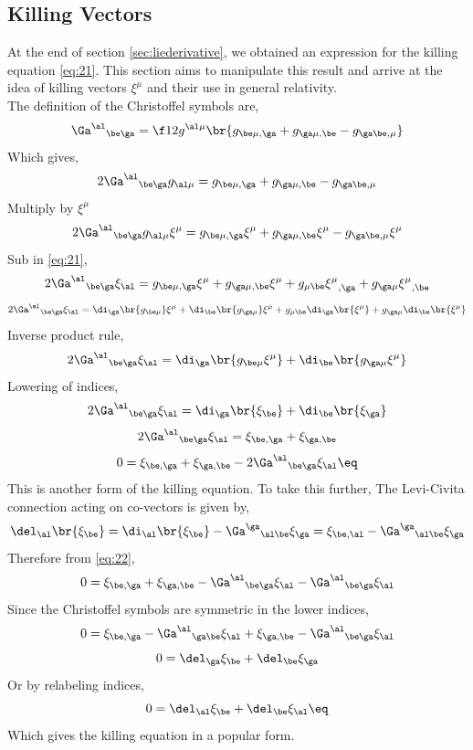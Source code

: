 \documentclass{article}
\begin{document}
\subsection{Killing Vectors}
\label{sec:killing}
At the end of section \ref{sec:liederivative}, we obtained an expression for the killing equation \eqref{eq:21}. This section aims to manipulate this result and arrive at the idea of killing vectors $\xi^\mu$ and their use in general relativity.\\

The definition of the Christoffel symbols are,
\[ {\Ga^\al}_{\be\ga} = \f12 g^{\al\mu}\br{g_{\be\mu,\ga} + g_{\ga\mu,\be} - g_{\ga\be,\mu}}  \]
Which gives,
\[ 2{\Ga^\al}_{\be\ga}g_{\al\mu} = g_{\be\mu,\ga} + g_{\ga\mu,\be} - g_{\ga\be,\mu}  \]
Multiply by $\xi^\mu$
\[ 2{\Ga^\al}_{\be\ga}g_{\al\mu}\xi^\mu = g_{\be\mu,\ga}\xi^\mu + g_{\ga\mu,\be}\xi^\mu - g_{\ga\be,\mu} \xi^\mu \]
Sub in \eqref{eq:21},
\[ 2{\Ga^\al}_{\be\ga}\xi_\al = g_{\be\mu,\ga}\xi^\mu + g_{\ga\mu,\be}\xi^\mu +g_{\mu\be} {\xi^\mu}_{,\ga} + g_{\ga\mu} {\xi^\mu}_{,\be}  \]
\[ 2{\Ga^\al}_{\be\ga}\xi_\al = \di_\ga\br{g_{\be\mu}}\xi^\mu + \di_\be\br{g_{\ga\mu}}\xi^\mu +g_{\mu\be} \di_\ga\br{\xi^\mu} + g_{\ga\mu} \di_\be\br{\xi^\mu}  \]
Inverse product rule,
\[ 2{\Ga^\al}_{\be\ga}\xi_\al = \di_\ga\br{g_{\be\mu}\xi^\mu} + \di_\be\br{g_{\ga\mu}\xi^\mu} \]
Lowering of indices,
\[ 2{\Ga^\al}_{\be\ga}\xi_\al = \di_\ga\br{\xi_\be} + \di_\be\br{\xi_\ga} \]
\[ 2{\Ga^\al}_{\be\ga}\xi_\al = \xi_{\be,\ga} + \xi_{\ga,\be} \]
\[ 0 = \xi_{\be,\ga} + \xi_{\ga,\be} - 2{\Ga^\al}_{\be\ga}\xi_\al \eq \label{eq:22}\]
This is another form of the killing equation. To take this further,
The Levi-Civita connection acting on co-vectors is given by,
\[ \del_\al \br{\xi_\be} = \di_\al\br{\xi_\be} - {\Ga^\ga}_{\al\be} \xi_\ga = \xi_{\be,\al} - {\Ga^\ga}_{\al\be} \xi_\ga \]
Therefore from \eqref{eq:22},
\[ 0 = \xi_{\be,\ga} + \xi_{\ga,\be} - {\Ga^\al}_{\be\ga}\xi_\al- {\Ga^\al}_{\be\ga}\xi_\al \]
Since the Christoffel symbols are symmetric in the lower indices,
\[ 0 = \xi_{\be,\ga} - {\Ga^\al}_{\ga\be}\xi_\al + \xi_{\ga,\be} - {\Ga^\al}_{\be\ga}\xi_\al \]
\[ 0 = \del_\ga \xi_\be + \del_\be \xi_\ga \]
Or by relabeling indices,
\[ 0 = \del_\al \xi_\be + \del_\be \xi_\al \eq \label{eq:killing} \]
Which gives the killing equation in a popular form.\\
\end{document}
